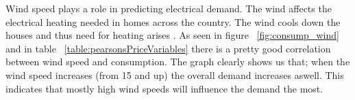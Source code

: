 Wind speed plays a role in predicting electrical demand. The wind affects the electrical heating needed in homes across the country. The wind cools down the houses and thus need for heating arises \cite{19}. As seen in figure ~\ref{fig:consump_wind} and in table ~\ref{table:pearsonsPriceVariables} there is a pretty good correlation between wind speed and consumption. The graph clearly shows us that; when the wind speed increases (from 15 and up) the overall demand increases aswell. This indicates that mostly high wind speeds will influence the demand the most.


